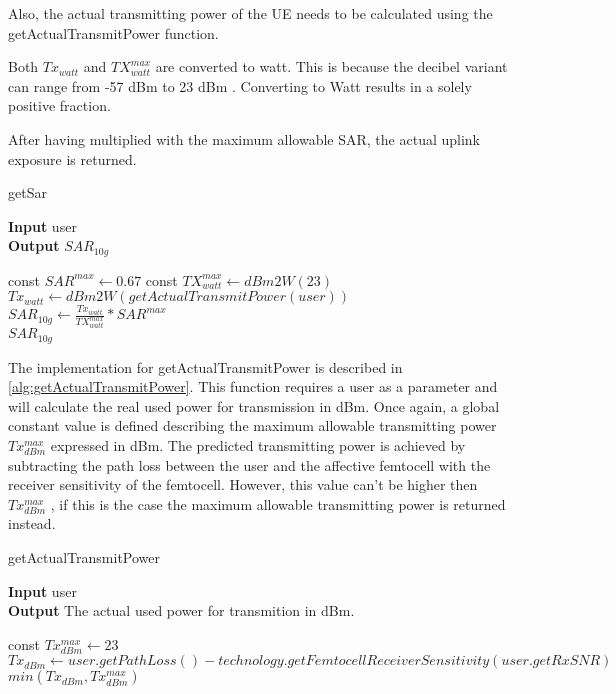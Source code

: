 Also, the actual transmitting power of the \gls{UE} needs to be calculated using the getActualTransmitPower function. 

Both $Tx_{watt}$ and $TX^{max}_{watt}$ are converted to watt. This is because the decibel variant can range from -57 dBm to 23 dBm \cite{J10_RDPgit}. Converting to Watt results in a solely positive fraction. 

After having multiplied with the maximum allowable \gls{SAR}, the actual uplink exposure is returned.

\begin{algorithm}
	\caption{getSar} 
	\label{alg:getsar}
     \hspace*{\algorithmicindent} \textbf{Input} user \\
     \hspace*{\algorithmicindent} \textbf{Output} $SAR_{10g}$
	\begin{algorithmic}[1]
		\State  const $SAR^{max} \gets 0.67$
		\State  const $TX^{max}_{watt} \gets dBm2W(23)$
		\vspace{4 mm}
		\State $Tx_{watt} \gets dBm2W(getActualTransmitPower(user)) $		
		\State $ SAR_{10g} \gets \frac{Tx_{watt}}{TX^{max}_{watt}} * SAR^{max}$ \\
		\Return $ SAR_{10g}$
	\end{algorithmic} 
\end{algorithm}


The implementation for getActualTransmitPower is described in \ref{alg:getActualTransmitPower}. This function requires a user as a parameter and will calculate the real used power for transmission in dBm.
Once again, a global constant value is defined describing the maximum allowable transmitting power $Tx^{max}_{dBm}$ expressed in dBm. The predicted transmitting power is achieved by subtracting the path loss between the user and the affective femtocell with the receiver sensitivity of the femtocell. However, this value can't be higher then  $Tx^{max}_{dBm}$ , if this is the case the maximum allowable transmitting power is returned instead.

\begin{algorithm}
	\caption{getActualTransmitPower} 
	\label{alg:getActualTransmitPower}
     \hspace*{\algorithmicindent} \textbf{Input} user \\
     \hspace*{\algorithmicindent} \textbf{Output} The actual used power for transmition in dBm.
	\begin{algorithmic}[1]
		\State const $Tx^{max}_{dBm} \gets 23$
		\vspace{4 mm}
		\State $ Tx_{dBm} \gets user.getPathLoss() - technology.getFemtocellReceiverSensitivity(user.getRxSNR)$ \\
		\Return $min(Tx_{dBm}, Tx^{max}_{dBm})$ 
	\end{algorithmic} 
\end{algorithm}
